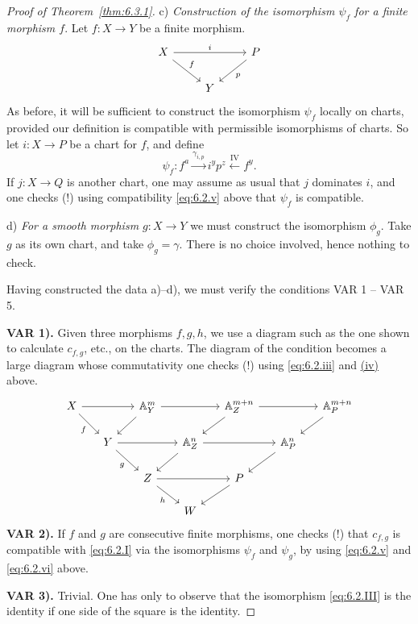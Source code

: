 \begin{proof}[Proof of Theorem~\ref{thm:6.3.1}]
\begingroup
\setlength{\emergencystretch}{2em}
\medskip{}\label{construction:6.3.c}\noindent c) \textit{Construction of the isomorphism $\psi_f$ for a finite morphism $f$}. Let $f\colon X\to Y$ be a finite morphism.
\[\begin{tikzcd}
	X\arrow[rr, "i"]\arrow[rd, "f"]&&P\arrow[ld, "p"]\\
	&Y
\end{tikzcd}\]
As before, it will be sufficient to construct the isomorphism $\psi_f$ locally on charts, provided our definition is compatible with permissible isomorphisms of charts. So let $i\colon X\to P$ be a chart for $f$, and define
\[
\psi_f\colon f^{a} \xrightarrow{\gamma_{i,p}} i^{y}p^{z} \xleftarrow{\mathrm{IV}} f^{y}.
\]
If $j\colon X\to Q$ is another chart, one may assume as usual that $j$ dominates $i$, and one checks (!) using compatibility \eqref{eq:6.2.v} above that $\psi_f$ is compatible.

\medskip{}\label{construction:6.3.d}\noindent d) \textit{For a smooth morphism $g\colon X\to Y$} we must construct the isomorphism $\phi_g$. Take $g$ as its own chart, and take $\phi_g = \gamma$. There is no choice involved, hence nothing to check.

Having constructed the data a)--d), we must verify the conditions VAR 1 -- VAR 5.

\medskip\noindent\textbf{VAR 1).} Given three morphisms $f,g,h$, we use a diagram such as the one shown to calculate $c_{f,g}$, etc., on the charts. The
diagram of the condition becomes a large diagram whose commutativity one checks (!) using \eqref{eq:6.2.iii} and \hyperref[compat:6.2.iv]{(iv)} above.
\[
\begin{tikzcd}[column sep=1.5em, row sep=1.5em]
	X \arrow[rr] \arrow[rd, "f"'] && \mathbb{A}^m_Y \arrow[rr] \arrow[ld] && \mathbb{A}^{m+n}_Z \arrow[rr] \arrow[ld] && \mathbb{A}^{m+n}_P \arrow[ld] \\
    &Y \arrow[rr] \arrow[rd, "g"'] && \mathbb{A}^n_Z \arrow[rr] \arrow[ld] && \mathbb{A}^n_P \arrow[ld] \\
	& &  Z \arrow[rr] \arrow[rd, "h"'] && P \arrow[ld] \\
	& & & W
\end{tikzcd}
\]
\medskip\noindent\textbf{VAR 2).} If $f$ and $g$ are consecutive finite morphisms, one checks (!) that $c_{f,g}$ is compatible with \eqref{eq:6.2.I} via the isomorphisms $\psi_f$ and $\psi_g$, by using \eqref{eq:6.2.v} and \eqref{eq:6.2.vi} above.

\medskip\noindent\textbf{VAR 3).} Trivial. One has only to observe that the isomorphism \eqref{eq:6.2.III} is the identity if one side of the square is the identity.


\end{proof}
